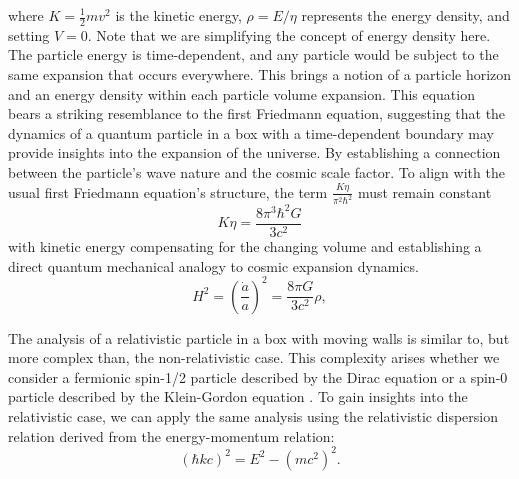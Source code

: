 \documentclass{article}
\begin{document}
where $K=\frac{1}{2}mv^{2}$ is the kinetic energy, $\rho=E/\eta$ represents the energy density, and setting $V=0$. Note that we are simplifying the concept of energy density here. The particle energy is time-dependent, and any particle would be subject to the same expansion that occurs everywhere. This brings a notion of a particle horizon and an energy density within each particle volume expansion. This equation bears a striking resemblance to the first Friedmann equation, suggesting that the dynamics of a quantum particle in a box with a time-dependent boundary may provide insights into the expansion of the universe. By establishing a connection between the particle's wave nature and the cosmic scale factor.
To align with the usual first Friedmann equation's structure, the term $\frac{K\eta}{\pi^2 \hbar^2}$ must remain constant
\begin{equation}
K\eta=\frac{8\pi^{3}\hbar^{2}G}{3c^{2}} \label{kineticvolumeconstar}
\end{equation}
with kinetic energy compensating for the changing volume and establishing a direct quantum mechanical analogy to cosmic expansion dynamics.
\begin{equation}
H^2 = \left( \frac{\dot{a}}{a} \right)^2 = \frac{8\pi G}{3c^{2}} \rho, \label{eq:Friedmann1fromQuantum2}
\end{equation}


The analysis of a relativistic particle in a box with moving walls is similar to, but more complex than, the non-relativistic case. This complexity arises whether we consider a fermionic spin-1/2 particle described by the Dirac equation or a spin-0 particle described by the Klein-Gordon equation \cite{Koehn:2012red}. To gain insights into the relativistic case, we can apply the same analysis using the relativistic dispersion relation derived from the energy-momentum relation:
\begin{equation}
(\hbar kc)^2  = E^2 - (mc^2)^2. \label{eqRelDispersion}
\end{equation}
\end{document}
